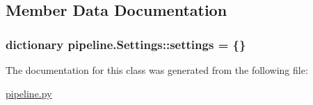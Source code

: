 \subsection{\-Member \-Data \-Documentation}
\hypertarget{classpipeline_1_1_settings_a98be6d6bf20eed43be0bd6f3543c396c}{
\subsubsection[{settings}]{\setlength{\rightskip}{0pt plus 5cm}dictionary {\bf pipeline.\-Settings\-::settings} = \{\}}}\label{classpipeline_1_1_settings_a98be6d6bf20eed43be0bd6f3543c396c}


\-The documentation for this class was generated from the following file\-:\begin{DoxyCompactItemize}
\item 
\hyperlink{pipeline_8py}{pipeline.\-py}\end{DoxyCompactItemize}
